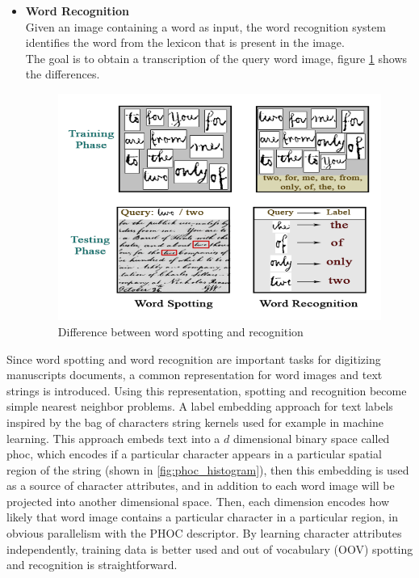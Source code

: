 \begin{itemize}[itemsep=1pt, topsep=5pt]
    \item \textbf{Word Recognition} \\
    Given an image containing a word as input, the word recognition system identifies the word from the lexicon that is present in the image. \\
    The goal is to obtain a transcription of the query word image, figure \ref{fig:wordspotting-vs-wordrecognition} shows the differences.
    \begin{figure}[!htb]
        \centering
        \includegraphics[width=11cm]{images/wordspotting-vs-wordrecognition.png}
        \caption{Difference between word spotting and recognition}
        \label{fig:wordspotting-vs-wordrecognition}
    \end{figure}
\end{itemize}

\noindent
Since word spotting and word recognition are important tasks for digitizing manuscripts documents, a common representation for word images and text strings is introduced. Using this representation, spotting and recognition become simple nearest neighbor problems. A label embedding approach for text labels inspired by the bag of characters string kernels used for example in machine learning. This approach embeds text into a $d$ dimensional binary space called \acrfull{phoc}, which encodes if a particular character appears in a particular spatial region of the string (shown in \ref{fig:phoc_histogram}), then this embedding is used as a source of character attributes, and in addition to each word image will be projected into another dimensional space. Then, each dimension encodes how likely that word image contains a particular character in a particular region, in obvious parallelism with the PHOC descriptor. By learning character attributes independently, training data is better used and out of vocabulary (OOV) spotting and recognition is straightforward. \\

